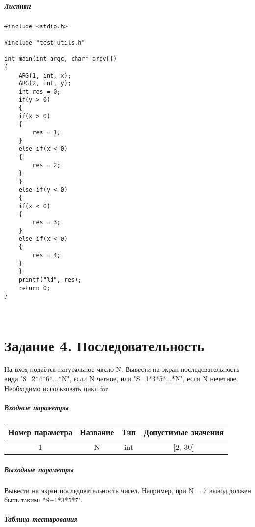 \paragraph{Листинг}
\begin{lstlisting}
#include <stdio.h>

#include "test_utils.h"

int main(int argc, char* argv[])
{
	ARG(1, int, x);
	ARG(2, int, y);
	int res = 0;
	if(y > 0)
	{
	if(x > 0)
	{
		res = 1;
	}
	else if(x < 0)
	{
		res = 2;
	}
	}
	else if(y < 0)
	{
	if(x < 0)
	{
		res = 3;
	}
	else if(x < 0)
	{
		res = 4;
	}
	}
	printf("%d", res);
	return 0;
}

\end{lstlisting}
\\
\chapter*{Задание 4. Последовательность}

На вход подаётся натуральное число N. Вывести на экран последовательность вида "S=2*4*6*...*N", если N четное, или "S=1*3*5*...*N", если N нечетное.
Необходимо использовать цикл for.

\paragraph{Входные параметры}

\begin{tabular}{ |c|c|c|c| }
\hline
Номер параметра & Название & Тип & Допустимые значения \\ 
 \hline
1 & N & int & [2, 30] \\ 
 \hline

\end{tabular}


\paragraph{Выходные параметры}

Вывести на экран последовательность чисел. Например, при N = 7 вывод должен быть таким: "S=1*3*5*7".

\paragraph{Таблица тестирования}

